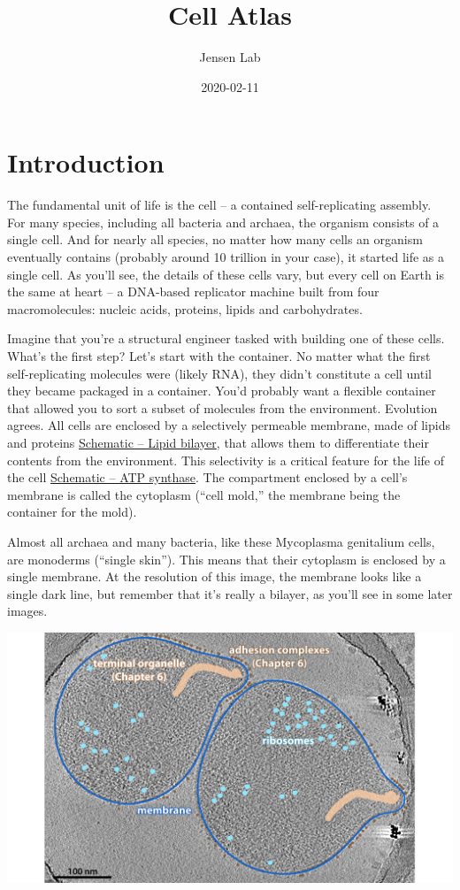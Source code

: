 \documentclass[]{book}
\title{Cell Atlas}
\author{Jensen Lab}
\date{2020-02-11}
\begin{document}
\maketitle

{
\setcounter{tocdepth}{1}
\tableofcontents
}
\hypertarget{bilayer}{\chapter{Introduction}\label{bilayer}}

The fundamental unit of life is the cell -- a contained self-replicating
assembly. For many species, including all bacteria and archaea, the
organism consists of a single cell. And for nearly all species, no
matter how many cells an organism eventually contains (probably around
10 trillion in your case), it started life as a single cell. As you'll
see, the details of these cells vary, but every cell on Earth is the
same at heart -- a DNA-based replicator machine built from four
macromolecules: nucleic acids, proteins, lipids and carbohydrates.

Imagine that you're a structural engineer tasked with building one of
these cells. What's the first step? Let's start with the container. No
matter what the first self-replicating molecules were (likely RNA), they
didn't constitute a cell until they became packaged in a container.
You'd probably want a flexible container that allowed you to sort a
subset of molecules from the environment. Evolution agrees. All cells
are enclosed by a selectively permeable membrane, made of lipids and
proteins \protect\hyperlink{bilayer}{Schematic -- Lipid bilayer}, that
allows them to differentiate their contents from the environment. This
selectivity is a critical feature for the life of the cell
\protect\hyperlink{atp}{Schematic -- ATP synthase}. The compartment
enclosed by a cell's membrane is called the cytoplasm (``cell mold,''
the membrane being the container for the mold).

Almost all archaea and many bacteria, like these Mycoplasma genitalium
cells, are monoderms (``single skin''). This means that their cytoplasm
is enclosed by a single membrane. At the resolution of this image, the
membrane looks like a single dark line, but remember that it's really a
bilayer, as you'll see in some later images.

\includegraphics{img/02_static/2_1_Mgenitalium.jpg}
\end{document}
